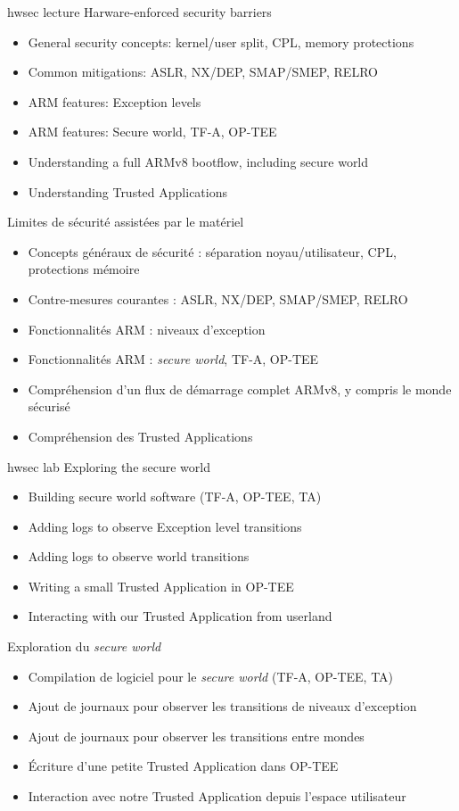 {hwsec}
{lecture}
{Harware-enforced security barriers}
{
  \begin{itemize}
  \item General security concepts: kernel/user split, CPL, memory protections
  \item Common mitigations: ASLR, NX/DEP, SMAP/SMEP, RELRO
  \item ARM features: Exception levels
  \item ARM features: Secure world, TF-A, OP-TEE
  \item Understanding a full ARMv8 bootflow, including secure world
  \item Understanding Trusted Applications
  \end{itemize}
}
{Limites de sécurité assistées par le matériel}
{
  \begin{itemize}
\item Concepts généraux de sécurité : séparation noyau/utilisateur,
  CPL, protections mémoire
\item Contre-mesures courantes : ASLR, NX/DEP, SMAP/SMEP, RELRO
\item Fonctionnalités ARM : niveaux d’exception
\item Fonctionnalités ARM : {\em secure world}, TF-A, OP-TEE
\item Compréhension d’un flux de démarrage complet ARMv8, y compris le
  monde sécurisé
\item Compréhension des Trusted Applications
  \end{itemize}
}

{hwsec}
{lab}
{Exploring the secure world}
{
  \begin{itemize}
  \item Building secure world software (TF-A, OP-TEE, TA)
  \item Adding logs to observe Exception level transitions
  \item Adding logs to observe world transitions
  \item Writing a small Trusted Application in OP-TEE
  \item Interacting with our Trusted Application from userland
  \end{itemize}
}
{Exploration du {\em secure world}}
{
  \begin{itemize}
  \item Compilation de logiciel pour le {\em secure world} (TF-A,
    OP-TEE, TA)
  \item Ajout de journaux pour observer les transitions de niveaux
    d’exception
  \item Ajout de journaux pour observer les transitions entre mondes
  \item Écriture d’une petite Trusted Application dans OP-TEE
  \item Interaction avec notre Trusted Application depuis l’espace
    utilisateur
  \end{itemize}
}

